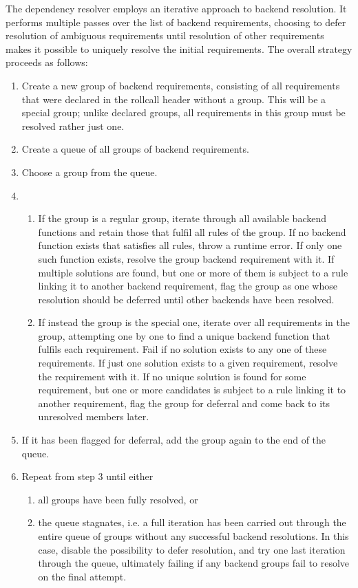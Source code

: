 \documentclass[pdftex,twocolumn,epjc3_preprint,runningheads]{svjour3}
\renewcommand{\_}{\discretionary{\underscore}{}{\underscore}}
\begin{document}
The dependency resolver employs an iterative approach to backend resolution.  It performs multiple passes over the list of backend requirements, choosing to defer resolution of ambiguous requirements until resolution of other requirements makes it possible to uniquely resolve the initial requirements.  The overall strategy proceeds as follows:
\begin{enumerate}
\item Create a new group of backend requirements, consisting of all requirements that were declared in the rollcall header without a group.  This will be a special group; unlike declared groups, all requirements in this group must be resolved rather just one.
\item Create a queue of all groups of backend requirements.
\item Choose a group from the queue.
\item \begin{enumerate}\item If the group is a regular group, iterate through all available backend functions and retain those that fulfil all rules of the group.  If no backend function exists that satisfies all rules, throw a runtime error.  If only one such function exists, resolve the group backend requirement with it.  If multiple solutions are found, but one or more of them is subject to a rule linking it to another backend requirement, flag the group as one whose resolution should be deferred until other backends have been resolved.
\item If instead the group is the special one, iterate over all requirements in the group, attempting one by one to find a unique backend function that fulfils each requirement.  Fail if no solution exists to any one of these requirements. If just one solution exists to a given requirement, resolve the requirement with it.  If no unique solution is found for some requirement, but one or more candidates is subject to a rule linking it to another requirement, flag the group for deferral and come back to its unresolved members later.\end{enumerate}
\item If it has been flagged for deferral, add the group again to the end of the queue.
\item Repeat from step 3 until either \begin{enumerate} \item all groups have been fully resolved, or \item the queue stagnates, i.e. a full iteration has been carried out through the entire queue of groups without any successful backend resolutions.  In this case, disable the possibility to defer resolution, and try one last iteration through the queue, ultimately failing if any backend groups fail to resolve on the final attempt.
\end{enumerate}\end{enumerate}
\end{document}
